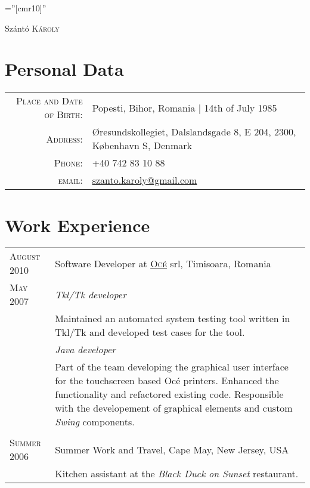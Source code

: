 \documentclass[a4paper,10pt]{article}
\begin{document}
\pagestyle{plain} %

\font\fb=''[cmr10]'' %

 
\par{\centering
		{\Huge Sz\'ant\'o \textsc{K\'aroly}
	}\bigskip\par}
	
\section{Personal Data}

\begin{tabular}{rl}
    \textsc{Place and Date of Birth:} & Popesti, Bihor, Romania  | 14th of July
    1985 \\ \textsc{Address:}   & Øresundskollegiet, Dalslandsgade 8, E 204,
    2300, København S, Denmark \\ 
    \textsc{Phone:}     & +40 742 83 10 88\\
    \textsc{email:}     &
    \href{mailto:szanto.karoly@gmail.com}{szanto.karoly@gmail.com}
\end{tabular}

\section{Work Experience}
\begin{tabular}{p{2.5cm}|p{11cm}}
 \raggedleft \textsc{August 2010} & Software Developer at
 \textsc{\href{http://www3.oce.com/ro/}{Oc\'e}} srl, Timisoara, Romania
 \\\raggedleft \textsc{May 2007}&\emph{Tkl/Tk
 developer}\\&\footnotesize{Maintained an automated system testing tool written in Tkl/Tk and developed test cases for the tool.}\\&\emph{Java
 developer}\\&\footnotesize{Part of the team developing the graphical user
 interface for the touchscreen based Oc\'e printers. Enhanced the functionality
 and refactored existing code. Responsible with the developement of graphical
 elements and custom \emph{Swing} components.}
\\\multicolumn{2}{c}{} \\
\raggedleft \textsc{Summer 2006} & Summer Work and Travel, Cape May, New Jersey,
USA\\&\footnotesize{Kitchen assistant at the \emph{Black Duck on Sunset}
restaurant.}
\end{tabular}
\end{document}
